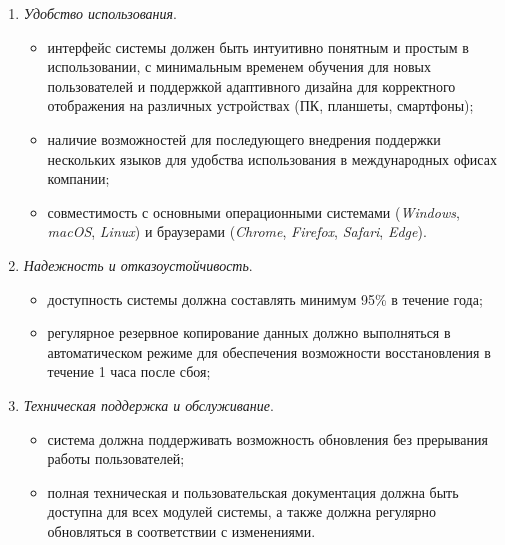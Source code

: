 \begin{enumerate}
    \item \textit{Удобство использования}.
        \begin{itemize}
            \item интерфейс системы должен быть интуитивно понятным и простым в использовании, с минимальным временем обучения для новых пользователей и поддержкой адаптивного дизайна для корректного отображения на различных устройствах (ПК, планшеты, смартфоны);
            \item наличие возможностей для последующего внедрения поддержки нес\-коль\-ких языков для удобства использования в международных офисах компании;
            \item совместимость с основными операционными системами (\textit{Win\-dows}, \textit{macOS}, \textit{Linux}) и браузерами (\textit{Chrome}, \textit{Firefox}, \textit{Safari}, \textit{Edge}).
        \end{itemize}

    \item \textit{Надежность и отказоустойчивость}.
        \begin{itemize}
            \item доступность системы должна составлять минимум 95\% в течение года;
            \item регулярное резервное копирование данных должно выполняться в автоматическом режиме для обеспечения возможности восстановления в течение 1 часа после сбоя;
        \end{itemize}

    \item \textit{Техническая поддержка и обслуживание}.
        \begin{itemize}
            \item система должна поддерживать возможность обновления без прерывания работы пользователей;
            \item полная техническая и пользовательская документация должна быть доступна для всех модулей системы, а также должна регулярно обновляться в соответствии с изменениями.
        \end{itemize}
\end{enumerate}
